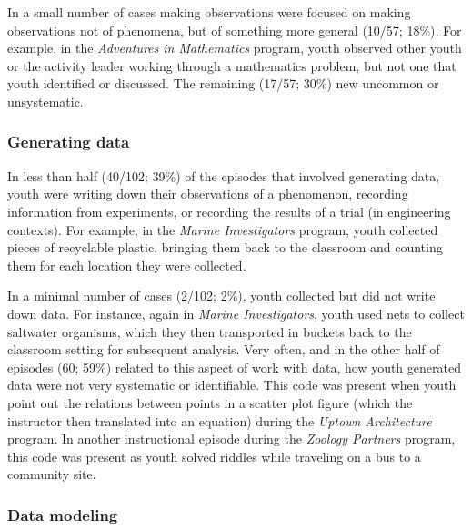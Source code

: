 \documentclass[]{book}
\theoremstyle{definition}
\theoremstyle{definition}
\theoremstyle{definition}
\theoremstyle{remark}
\begin{document}
In a small number of cases making observations were focused on making
observations not of phenomena, but of something more general (10/57;
18\%). For example, in the \emph{Adventures in Mathematics} program,
youth observed other youth or the activity leader working through a
mathematics problem, but not one that youth identified or discussed. The
remaining (17/57; 30\%) new uncommon or unsystematic.

\subsubsection{Generating data}\label{generating-data}

In less than half (40/102; 39\%) of the episodes that involved
generating data, youth were writing down their observations of a
phenomenon, recording information from experiments, or recording the
results of a trial (in engineering contexts). For example, in the
\emph{Marine Investigators} program, youth collected pieces of
recyclable plastic, bringing them back to the classroom and counting
them for each location they were collected.

In a minimal number of cases (2/102; 2\%), youth collected but did not
write down data. For instance, again in \emph{Marine Investigators},
youth used nets to collect saltwater organisms, which they then
transported in buckets back to the classroom setting for subsequent
analysis. Very often, and in the other half of episodes (60; 59\%)
related to this aspect of work with data, how youth generated data were
not very systematic or identifiable. This code was present when youth
point out the relations between points in a scatter plot figure (which
the instructor then translated into an equation) during the \emph{Uptown
Architecture} program. In another instructional episode during the
\emph{Zoology Partners} program, this code was present as youth solved
riddles while traveling on a bus to a community site.

\subsubsection{Data modeling}\label{data-modeling}
\end{document}

